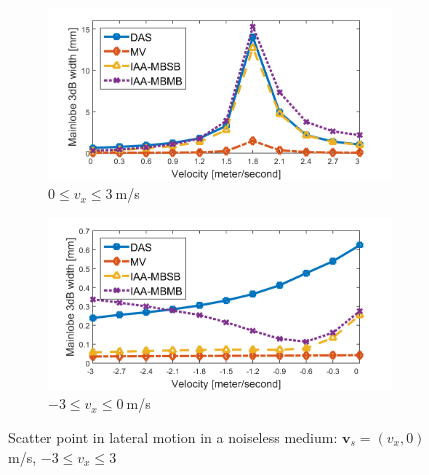 \begin{figure}[ht]
    \centering
    \begin{subfigure}[t]{\linewidth}
        \includegraphics[width=\linewidth]{./images/results/2.1/speeds_ext_pos.png}
        \caption{$0 \leq v_x \leq 3~$m/s}
	    \label{fig:width_vs_velocity_ext_pos}
    \end{subfigure}
    \quad
    \begin{subfigure}[t]{\linewidth}
        \includegraphics[width=\linewidth]{./images/results/2.1/speeds_ext_neg.png}
        \caption{$-3 \leq v_x \leq 0~$m/s}
	    \label{fig:width_vs_velocity_ext_neg}
    \end{subfigure}
	\caption{Scatter point in lateral motion in a noiseless medium: $\boldsymbol{v}_s = (v_x, 0)~$m/s, $-3 \leq v_x \leq 3$}
	\label{fig:width_vs_velocity_ext}
\end{figure}

